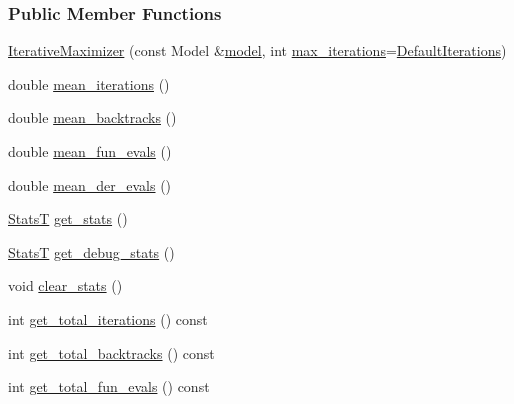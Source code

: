 \subsubsection*{Public Member Functions}
\begin{DoxyCompactItemize}
\item 
\hyperlink{classmappel_1_1estimator_1_1IterativeMaximizer_a9b53c42916002adba7e5ead819196e1d}{Iterative\+Maximizer} (const Model \&\hyperlink{classmappel_1_1estimator_1_1Estimator_a2f157410771fb79a20d4d54e505750d0}{model}, int \hyperlink{classmappel_1_1estimator_1_1IterativeMaximizer_abf5fe0b08cfbcc403c3d01511726aa38}{max\+\_\+iterations}=\hyperlink{classmappel_1_1estimator_1_1IterativeMaximizer_ab66c01c2eee630f3fca119f3fe09a19a}{Default\+Iterations})
\item 
double \hyperlink{classmappel_1_1estimator_1_1IterativeMaximizer_a70504eeacb590296d249a51970736d3a}{mean\+\_\+iterations} ()
\item 
double \hyperlink{classmappel_1_1estimator_1_1IterativeMaximizer_a26cc129f7253798b7484a25ac59dfa71}{mean\+\_\+backtracks} ()
\item 
double \hyperlink{classmappel_1_1estimator_1_1IterativeMaximizer_ad6a2fc4797c19c411fde894669f1edba}{mean\+\_\+fun\+\_\+evals} ()
\item 
double \hyperlink{classmappel_1_1estimator_1_1IterativeMaximizer_a0fbb35e6f015bf1e1c5b1ee89f08cbad}{mean\+\_\+der\+\_\+evals} ()
\item 
\hyperlink{namespacemappel_a04ab395b0cf82c4ce68a36b2212649a5}{StatsT} \hyperlink{classmappel_1_1estimator_1_1IterativeMaximizer_a8a274f11cad09057aa2b0bc69f291c22}{get\+\_\+stats} ()
\item 
\hyperlink{namespacemappel_a04ab395b0cf82c4ce68a36b2212649a5}{StatsT} \hyperlink{classmappel_1_1estimator_1_1IterativeMaximizer_aa8f8cb9c66b559badee924617ec690b6}{get\+\_\+debug\+\_\+stats} ()
\item 
void \hyperlink{classmappel_1_1estimator_1_1IterativeMaximizer_a9c41aae7db286746e72e3d0ff8af1d13}{clear\+\_\+stats} ()
\item 
int \hyperlink{classmappel_1_1estimator_1_1IterativeMaximizer_a8c639ea1bf84e4531364906c933584af}{get\+\_\+total\+\_\+iterations} () const 
\item 
int \hyperlink{classmappel_1_1estimator_1_1IterativeMaximizer_a5b689ae57a9f2bf64739fab6d32ca74b}{get\+\_\+total\+\_\+backtracks} () const 
\item 
int \hyperlink{classmappel_1_1estimator_1_1IterativeMaximizer_a4ab922cd52088ae3e940e4f0d6fac066}{get\+\_\+total\+\_\+fun\+\_\+evals} () const 

\end{DoxyCompactItemize}
